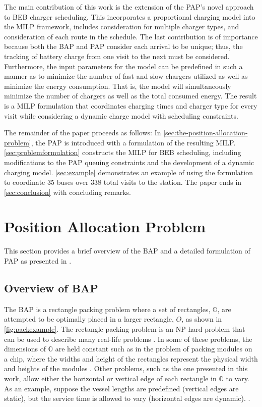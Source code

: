 \documentclass[ee,thesis]{usuthesis}
\newcommand{\A}{35 }                                                            %
\newcommand{\N}{338 }                                                           %
\begin{document}
The main contribution of this work is the extension of the PAP's novel approach to BEB charger scheduling. This
incorporates a proportional charging model into the MILP framework, includes consideration for multiple charger types,
and consideration of each route in the schedule. The last contribution is of importance because both the BAP and PAP
consider each arrival to be unique; thus, the tracking of battery charge from one visit to the next must be considered.
Furthermore, the input parameters for the model can be predefined in such a manner as to minimize the number of fast and
slow chargers utilized as well as minimize the energy consumption. That is, the model will simultaneously minimize the
number of chargers as well as the total consumed energy. The result is a MILP formulation that coordinates charging
times and charger type for every visit while considering a dynamic charge model with scheduling constraints.

The remainder of the paper proceeds as follows: In \autoref{sec:the-position-allocation-problem}, the PAP is introduced
with a formulation of the resulting MILP. \autoref{sec:problemformulation} constructs the MILP for BEB scheduling,
including modifications to the PAP queuing constraints and the development of a dynamic charging model.
\autoref{sec:example} demonstrates an example of using the formulation to coordinate \A buses over \N total visits to
the station. The paper ends in \autoref{sec:conclusion} with concluding remarks.

\section{Position Allocation Problem}
\label{sec:the-position-allocation-problem}
This section provides a brief overview of the BAP and a detailed formulation of PAP as presented in
\cite{qarebagh-2019-optim-sched}.

\subsection{Overview of BAP}
\label{sec:overview-of-bap}
The BAP is a rectangle packing problem where a set of rectangles, \(\mathbb{O}\), are attempted to be optimally placed in
a larger rectangle, \(O\), as shown in \autoref{fig:packexample}. The rectangle packing problem is an NP-hard problem that
can be used to describe many real-life problems \cite{bruin-2013-rectan-packin,murata-1995-rectan}. In some of these
problems, the dimensions of \(\mathbb{O}\) are held constant such as in the problem of packing modules on a chip, where
the widths and height of the rectangles represent the physical width and heights of the modules
\cite{murata-1995-rectan}. Other problems, such as the one presented in this work, allow either the horizontal or
vertical edge of each rectangle in \(\mathbb{O}\) to vary. As an example, suppose the vessel lengths are predefined
(vertical edges are static), but the service time is allowed to vary (horizontal edges are dynamic).
\cite{buhrkal-2011-model-discr}.
\end{document}
